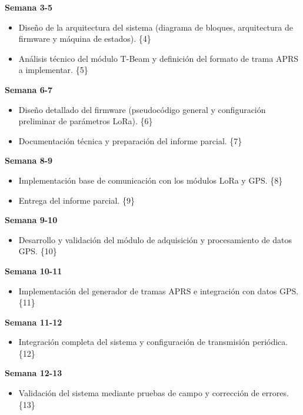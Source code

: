 \documentclass[conference]{IEEEtran}
\begin{document}
\textbf{Semana 3-5}

\begin{itemize}
    \item Diseño de la arquitectura del sistema (diagrama de bloques, arquitectura de firmware y máquina de estados). \{4\}
    \item Análisis técnico del módulo T-Beam y definición del formato de trama APRS a implementar. \{5\}
\end{itemize}

\textbf{Semana 6-7}

\begin{itemize}
    \item Diseño detallado del firmware (pseudocódigo general y configuración preliminar de parámetros LoRa). \{6\}
    \item Documentación técnica y preparación del informe parcial. \{7\}
\end{itemize}

\textbf{Semana 8-9}

\begin{itemize}
    \item Implementación base de comunicación con los módulos LoRa y GPS. \{8\}
    \item Entrega del informe parcial. \{9\}
\end{itemize}

\textbf{Semana 9-10}

\begin{itemize}
    \item Desarrollo y validación del módulo de adquisición y procesamiento de datos GPS. \{10\}
\end{itemize}

\textbf{Semana 10-11}

\begin{itemize}
    \item Implementación del generador de tramas APRS e integración con datos GPS. \{11\}
\end{itemize}

\textbf{Semana 11-12}

\begin{itemize}
    \item Integración completa del sistema y configuración de transmisión periódica. \{12\}
\end{itemize}

\textbf{Semana 12-13}

\begin{itemize}
    \item Validación del sistema mediante pruebas de campo y corrección de errores. \{13\}
\end{itemize}
\end{document}
